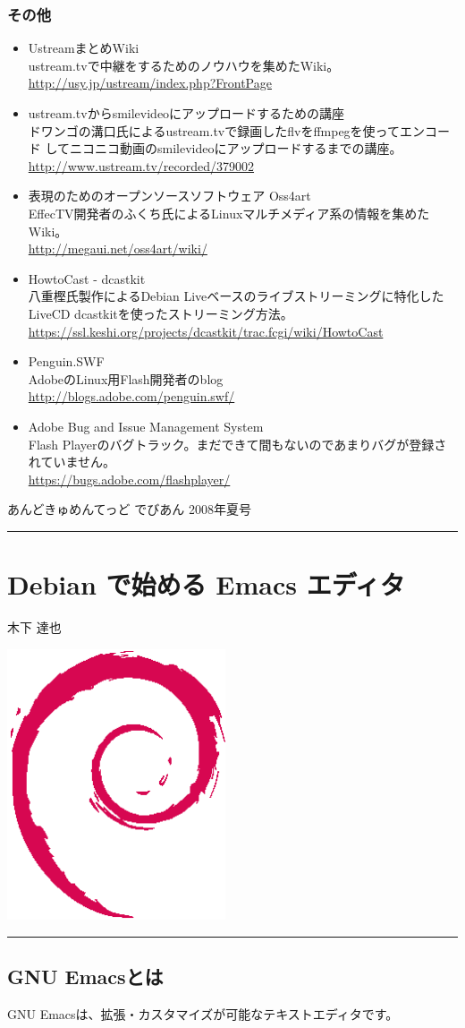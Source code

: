 \documentclass[mingoth,a4paper]{jsarticle}
\renewcommand{\dancersection}[2]{%
\newpage
あんどきゅめんてっど でびあん 2008年夏号
%
\vspace{0.1mm}\\
{\color{dancerlightblue}\rule{\hsize}{2mm}}

%
%
\begin{minipage}[t]{0.6\hsize}
\color{dancerdarkblue}
\vspace{1cm}
\section{#1}
\hfill{}#2\\
\end{minipage}
\begin{minipage}[t]{0.4\hsize}
\vspace{-2cm}
\hfill{}\includegraphics[height=8cm]{image200502/openlogo-nd.eps}\\
\vspace{-5cm}
\end{minipage}
%
%
{\color{dancerdarkblue}\rule{0.74\hsize}{2mm}}
%
\vspace{2cm}
}
\begin{document}
\subsubsection{その他}

\begin{itemize}
\item UstreamまとめWiki\\
ustream.tvで中継をするためのノウハウを集めたWiki。\\
\url{http://usy.jp/ustream/index.php?FrontPage}

\item ustream.tvからsmilevideoにアップロードするための講座 \\
ドワンゴの溝口氏によるustream.tvで録画したflvをffmpegを使ってエンコード
してニコニコ動画のsmilevideoにアップロードするまでの講座。\\
\url{http://www.ustream.tv/recorded/379002}

\item 表現のためのオープンソースソフトウェア Oss4art \\
EffecTV開発者のふくち氏によるLinuxマルチメディア系の情報を集めたWiki。\\
\url{http://megaui.net/oss4art/wiki/}

\item HowtoCast - dcastkit \\
八重樫氏製作によるDebian Liveベースのライブストリーミングに特化した
LiveCD dcastkitを使ったストリーミング方法。\\
\url{https://ssl.keshi.org/projects/dcastkit/trac.fcgi/wiki/HowtoCast}

\item Penguin.SWF\\
AdobeのLinux用Flash開発者のblog\\
\url{http://blogs.adobe.com/penguin.swf/}

\item Adobe Bug and Issue Management System\\
Flash Playerのバグトラック。まだできて間もないのであまりバグが登録されていません。\\
\url{https://bugs.adobe.com/flashplayer/}

\end{itemize}

\dancersection{Debian で始める Emacs エディタ}{木下 達也}

\subsection{GNU Emacsとは}
GNU Emacsは、拡張・カスタマイズが可能なテキストエディタです。
\end{document}
